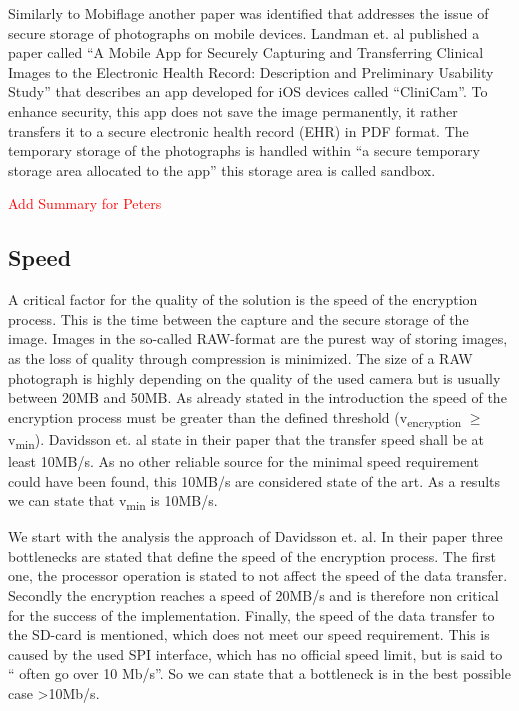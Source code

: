 \documentclass[12pt,a4paper,titlepage,oneside]{scrartcl}
\newcommand\todo[1]{\textcolor{red}{#1}}
\begin{document}
Similarly to Mobiflage another paper was identified that addresses the issue of secure storage of photographs on mobile devices.
Landman et. al \cite{pmid25565678} published a paper called ``A Mobile App for Securely Capturing and Transferring Clinical Images to the Electronic Health Record: Description and Preliminary Usability Study'' that describes an app developed for iOS devices called ``CliniCam''.
To enhance security, this app does not save the image permanently, it rather transfers it to a secure electronic health record (EHR) in PDF format.
The temporary storage of the photographs is handled within ``a secure temporary storage area allocated to the app'' this storage area is called sandbox.

\todo{Add Summary for Peters}

\subsection{Speed}
A critical factor for the quality of the solution is the speed of the encryption process.
This is the time between the capture and the secure storage of the image.
Images in the so-called RAW-format are the purest way of storing images, as the loss of quality through compression is minimized.
The size of a RAW photograph is highly depending on the quality of the used camera but is usually between 20MB and 50MB.
As already stated in the introduction the speed of the encryption process must be greater than the defined threshold (v\textsubscript{encryption} $\geq$ v\textsubscript{min}).
Davidsson et. al \cite{Davidsson2016} state in their paper that the transfer speed shall be at least 10MB/s.
As no other reliable source for the minimal speed requirement could have been found, this 10MB/s are considered state of the art.
As a results we can state that v\textsubscript{min} is 10MB/s.

We start with the analysis the approach of Davidsson et. al.
In their paper three bottlenecks are stated that define the speed of the encryption process.
The first one, the processor operation is stated to not affect the speed of the data transfer.
Secondly the encryption reaches a speed of 20MB/s and is therefore non critical for the success of the implementation.
Finally, the speed of the data transfer to the SD-card is mentioned, which does not meet our speed requirement.
This is caused by the used SPI interface, which has no official speed limit, but is said to `` often go over 10 Mb/s''\cite{leens2009introduction}.
So we can state that a bottleneck is in the best possible case >10Mb/s.
\end{document}
